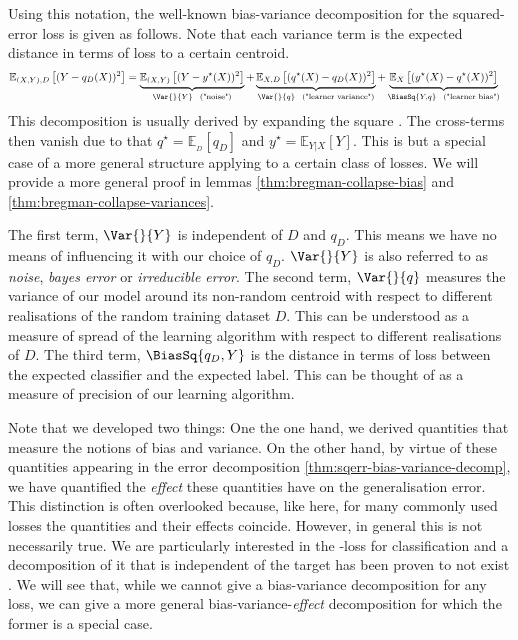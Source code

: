 \documentclass[
    a4paper, %
	fontsize=10pt, %
	twoside=false, %
]{kaobook}
\begin{document}
Using this notation, the well-known bias-variance decomposition for the squared-error loss is given as follows.
Note that each variance term is the expected distance in terms of loss to a certain centroid.
\begin{align} \label{thm:sqerr-bias-variance-decomp}
\mathbb{E}_{(X,Y), D}\left[ (Y-q_{D}(X))^2 \right]  
&= \underbrace{\mathbb{E}_{(X,Y)}\left[ (Y-y^\star(X))^2 \right]   }_{\Var{}{Y} ~~ \text{("noise")}}
+ \underbrace{\mathbb{E}_{X, D}\left[ (q^\star(X) - q_{D}(X))^2 \right]   }_{\Var{}{q} ~~ \text{("learner variance")}}
+ \underbrace{ \mathbb{E}_{X}\left[  (y^\star(X) - q^\star(X))^2\right] 
  }_{\BiasSq{Y, q} ~~ \text{("learner bias")}}
\end{align}
This decomposition is usually derived by expanding the square \cite{todo}. The cross-terms then vanish due to that $  q^\star = \mathbb{E}_{_{D}}\left[ q_{D} \right]$ and $y^\star = \mathbb{E}_{Y|X}\left[ Y \right]$.
This is but a special case of a more general structure applying to a certain class of losses. We will provide a more general proof in lemmas \ref{thm:bregman-collapse-bias} and \ref{thm:bregman-collapse-variances}.

The first term, $\Var{}{Y}$ is independent of $D$ and $q_{D}$. This means we have no means of influencing it with our choice of $q_{D}$.
$\Var{}{Y}$ is also referred to as \textit{noise}, \textit{bayes error} or \textit{irreducible error}. 
The second term, $\Var{}{q}$ measures the variance of our model around its non-random centroid with respect to different realisations of the random training dataset $D$. This can be understood as a measure of spread of the learning algorithm with respect to different realisations of $D$.
The third term, $\BiasSq{q_{D}, Y}$ is the distance in terms of loss between the expected classifier and the expected label. This can be thought of as a measure of precision of our learning algorithm. 

Note that we developed two things:
One the one hand, we derived quantities that measure the notions of bias and variance. On the other hand, by virtue of these quantities appearing in the error decomposition \ref{thm:sqerr-bias-variance-decomp}, we have quantified the \textit{effect} these quantities have on the generalisation error.
This distinction is often overlooked because, like here, for many commonly used losses the quantities and their effects coincide. However, in general this is not necessarily true. We are particularly interested in the \zeroone-loss for classification and a decomposition of it that is independent of the target has been proven to not exist \cite{todo}. We will see that, while we cannot give a bias-variance decomposition for any loss, we can give a more general bias-variance-\textit{effect} decomposition for which the former is a special case.
\end{document}
